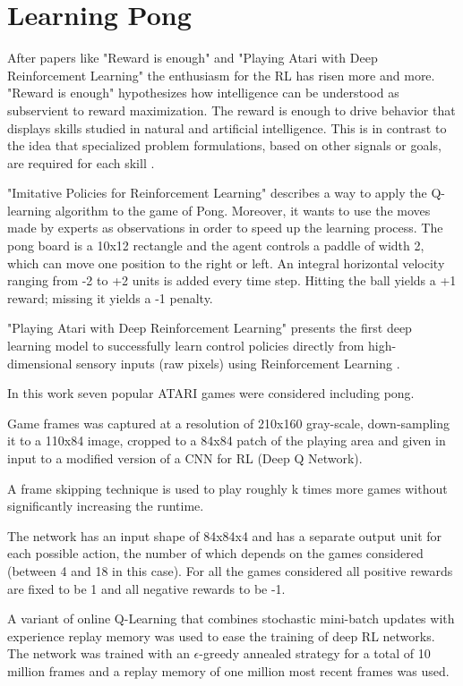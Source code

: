 \section{Learning Pong}

After papers like "Reward is enough"\cite{silver2021reward} and "Playing Atari with Deep Reinforcement Learning"\cite{mnih2013playing} the enthusiasm for the RL has risen more and more.
"Reward is enough" hypothesizes how intelligence can be understood as subservient to reward maximization. The reward is enough to drive behavior that displays skills studied in natural and artificial intelligence. This is in contrast to the idea that specialized problem formulations, based on other signals or goals, are required for each skill \cite{silver2021reward}.

"Imitative Policies for Reinforcement Learning" \cite{dahlstrom2002imitative} describes a way to apply the Q-learning algorithm to the game of Pong. Moreover, it wants to use the moves made by experts as observations in order to speed up the learning process. 
The pong board is a 10x12 rectangle and the agent controls a paddle of width 2, which can move one position to the right or left.
An integral horizontal velocity ranging from -2 to +2 units is added every time step. Hitting the ball yields a +1 reward; missing it yields a -1 penalty.

"Playing Atari with Deep Reinforcement Learning" presents the first deep learning model to successfully learn control policies directly from high-dimensional sensory inputs (raw pixels) using Reinforcement Learning \cite{mnih2013playing}.

In this work seven popular ATARI games were considered including pong.

Game frames was captured at a resolution of 210x160 gray-scale, down-sampling it to a 110x84 image, cropped to a 84x84 patch of the playing area
and given in input to a modified version of a CNN for RL (Deep Q Network).

A frame skipping technique is used to play roughly k times more games without significantly increasing the runtime.

The network has an input shape of 84x84x4 and has a separate output unit for each possible action, the number of which depends on the games considered (between 4 and 18 in this case).
For all the games considered all positive rewards are fixed to be 1 and all negative rewards to be -1.

A variant of online Q-Learning that combines stochastic mini-batch updates with experience replay memory was used to ease the training of deep RL networks.
The network was trained with an $\epsilon$-greedy annealed strategy for a total of 10 million frames and a replay memory of one million most recent frames was used.




